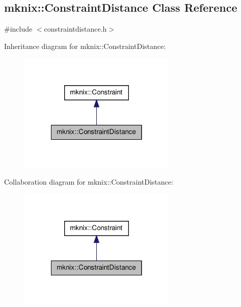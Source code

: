 \hypertarget{classmknix_1_1_constraint_distance}{\subsection{mknix\-:\-:Constraint\-Distance Class Reference}
\label{classmknix_1_1_constraint_distance}
}


{\ttfamily \#include $<$constraintdistance.\-h$>$}



Inheritance diagram for mknix\-:\-:Constraint\-Distance\-:\nopagebreak
\begin{figure}[H]
\begin{center}
\leavevmode
\includegraphics[width=212pt]{dd/dfd/classmknix_1_1_constraint_distance__inherit__graph}
\end{center}
\end{figure}


Collaboration diagram for mknix\-:\-:Constraint\-Distance\-:\nopagebreak
\begin{figure}[H]
\begin{center}
\leavevmode
\includegraphics[width=212pt]{da/d3d/classmknix_1_1_constraint_distance__coll__graph}
\end{center}
\end{figure}
